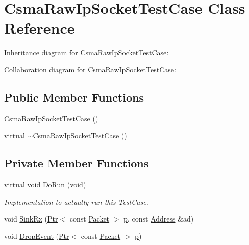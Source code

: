 \hypertarget{classCsmaRawIpSocketTestCase}{}\section{Csma\+Raw\+Ip\+Socket\+Test\+Case Class Reference}
\label{classCsmaRawIpSocketTestCase}


Inheritance diagram for Csma\+Raw\+Ip\+Socket\+Test\+Case\+:


Collaboration diagram for Csma\+Raw\+Ip\+Socket\+Test\+Case\+:
\subsection*{Public Member Functions}
\begin{DoxyCompactItemize}
\item 
\hyperlink{classCsmaRawIpSocketTestCase_a301f01915797553df02cc8deea819d91}{Csma\+Raw\+Ip\+Socket\+Test\+Case} ()
\item 
virtual \hyperlink{classCsmaRawIpSocketTestCase_a668fe5ad8192f3e2d88d8a164b163936}{$\sim$\+Csma\+Raw\+Ip\+Socket\+Test\+Case} ()
\end{DoxyCompactItemize}
\subsection*{Private Member Functions}
\begin{DoxyCompactItemize}
\item 
virtual void \hyperlink{classCsmaRawIpSocketTestCase_abebb23d96a216d35072bc800316c23cb}{Do\+Run} (void)
\begin{DoxyCompactList}\small\item\em Implementation to actually run this Test\+Case. \end{DoxyCompactList}\item 
void \hyperlink{classCsmaRawIpSocketTestCase_a30062f3f8b86d4f406902493199a8054}{Sink\+Rx} (\hyperlink{classns3_1_1Ptr}{Ptr}$<$ const \hyperlink{classns3_1_1Packet}{Packet} $>$ \hyperlink{lte__link__budget__x2__handover__measures_8m_ac9de518908a968428863f829398a4e62}{p}, const \hyperlink{classns3_1_1Address}{Address} \&ad)
\item 
void \hyperlink{classCsmaRawIpSocketTestCase_a0fa8c96c9d34d6721f5761dbbebe6af4}{Drop\+Event} (\hyperlink{classns3_1_1Ptr}{Ptr}$<$ const \hyperlink{classns3_1_1Packet}{Packet} $>$ \hyperlink{lte__link__budget__x2__handover__measures_8m_ac9de518908a968428863f829398a4e62}{p})
\end{DoxyCompactItemize}
